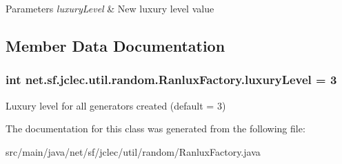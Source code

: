\begin{DoxyParams}{Parameters}
{\em luxury\-Level} & New luxury level value \\
\hline
\end{DoxyParams}


\subsection{Member Data Documentation}
\hypertarget{classnet_1_1sf_1_1jclec_1_1util_1_1random_1_1_ranlux_factory_ad4c3040a1505d5eb9f24d87f879bec15}{
\subsubsection[{luxury\-Level}]{\setlength{\rightskip}{0pt plus 5cm}int net.\-sf.\-jclec.\-util.\-random.\-Ranlux\-Factory.\-luxury\-Level = 3\hspace{0.3cm}{\ttfamily [protected]}}}\label{classnet_1_1sf_1_1jclec_1_1util_1_1random_1_1_ranlux_factory_ad4c3040a1505d5eb9f24d87f879bec15}
Luxury level for all generators created (default = 3) 

The documentation for this class was generated from the following file\-:\begin{DoxyCompactItemize}
\item 
src/main/java/net/sf/jclec/util/random/Ranlux\-Factory.\-java\end{DoxyCompactItemize}

